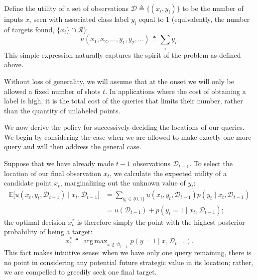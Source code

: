 \documentclass{article}
\newcommand{\cm}[1]{\mathcal{#1}}
\newcommand{\data}{\cm{D}}
\newcommand{\given}{\mid}
\DeclareMathOperator*{\argmax}{arg\,max}
\begin{document}
Define the utility of a set of observations $\data \triangleq
\bigl\lbrace (x_i, y_i) \bigr\rbrace$ to be the number of inputs $x_i$
seen with associated class label $y_i$ equal to 1 (equivalently, the
number of targets found, $\lbrace x_i \rbrace \cap \cm{R}$):
\begin{equation*}
  u(x_1, x_2, \dotsc, y_1, y_2, \dotsc) \triangleq
  \sum_i y_i.
\end{equation*}
This simple expression naturally captures the spirit of the problem
as defined above.

Without loss of generality, we will assume that at the onset we will
only be allowed a fixed number of shots $t$. In applications where the
cost of obtaining a label is high, it is the total cost of the queries
that limits their number, rather than the quantity of unlabeled
points.

We now derive the policy for successively deciding the locations of
our queries.  We begin by considering the case when we are allowed to
make exactly one more query and will then address the general case.

Suppose that we have already made $t-1$ observations $\data_{t-1}$.
To select the location of our final observation $x_t$, we calculate
the expected utility of a candidate point $x_t$, marginalizing out the
unknown value of $y_t$:
\begin{align*}
  \mathbb{E}
  \bigl[
    u(x_t, y_t, \data_{t-1}) \given x_t, \data_{t-1} 
  \bigr]
  &=
  \sum_{y_t \in \lbrace 0, 1 \rbrace} u(x_t, y_t, \data_{t-1}) p(y_t \given x_t, \data_{t-1})
  \\
  &=
  u(\data_{t-1}) + p(y_t = 1 \given x_t, \data_{t-1});
\end{align*}
the optimal decision $x_t^\ast$ is therefore simply the point with the
highest posterior probability of being a target:
\begin{equation}\label{onestep}
  x_t^\ast 
  \triangleq 
  \argmax_{x \notin \data_{t-1}} 
  p(y = 1\given x, \data_{t-1}).
\end{equation}
This fact makes intuitive sense: when we have only one query
remaining, there is no point in considering any potential future
strategic value in its location; rather, we are compelled to greedily
seek one final target.
\end{document}
